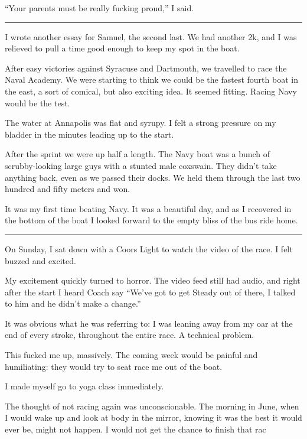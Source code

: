 ``Your parents must be really fucking proud,'' I said.

\plainfancybreak{12pt}{2}{}


I wrote another essay for Samuel, the second last.  We had another 2k, and I was
relieved to pull a time good enough to keep my spot in the boat.

After easy victories against Syracuse and Dartmouth, we travelled to race the
Naval Academy.  We were starting to think we could be the fastest fourth boat in
the east, a sort of comical, but also exciting idea.  It seemed fitting.  Racing
Navy would be the test.

The water at Annapolis was flat and syrupy.  I felt a strong pressure on my
bladder in the minutes leading up to the start.   

After the sprint we were up half a length.  The Navy boat was a bunch of
scrubby-looking large guys with a stunted male coxswain.  They didn't take
anything back, even as we passed their docks.  We held them through the last two
hundred and fifty meters and won.  

It was my first time beating Navy.  It was a beautiful day, and as I recovered
in the bottom of the boat I looked forward to the empty bliss of the bus ride
home.

\plainfancybreak{12pt}{2}{}

On Sunday, I sat down with a Coors Light to watch the video of the race.  I felt
buzzed and excited. 

My excitement quickly turned to horror.  The video feed still had audio, and
right after the start I heard Coach say ``We've got to get Steady out of there,
I talked to him and he didn't make a change.''  

It was obvious what he was referring to: I was leaning away from my oar at the
end of every stroke, throughout the entire race.  A technical problem.

This fucked me up, massively.  The coming week would be painful and humiliating:
they would try to seat race me out of the boat.

I made myself go to yoga class immediately.  


The thought of not racing again was unconscionable.  The morning in June, when I
would wake up and look at body in the mirror, knowing it was the best it would
ever be, might not happen.  I would not get the chance to finish that rac

